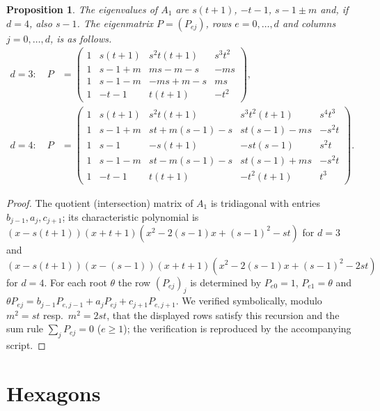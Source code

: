 \documentclass[11pt]{article}
\newtheorem{proposition}[theorem]{Proposition}
\theoremstyle{remark}
\begin{document}
\begin{proposition}\label{prop:P}
The eigenvalues of $A_1$ are $s(t+1)$, $-t-1$, $s-1\pm m$ and, if $d=4$, also $s-1$. The eigenmatrix $P=(P_{ej})$, rows $e=0,\dots,d$ and columns $j=0,\dots,d$, is as follows.
\begin{align*}
d=3:\quad P&=\begin{pmatrix}
1 & s(t+1) & s^2t(t+1) & s^3t^2\\
1 & s-1+m & ms-m-s & -ms\\
1 & s-1-m & -ms+m-s & ms\\
1 & -t-1 & t(t+1) & -t^2
\end{pmatrix},\\[4pt]
d=4:\quad P&=\begin{pmatrix}
1 & s(t+1) & s^2t(t+1) & s^3t^2(t+1) & s^4t^3\\
1 & s-1+m & st+m(s-1)-s & st(s-1)-ms & -s^2t\\
1 & s-1 & -s(t+1) & -st(s-1) & s^2t\\
1 & s-1-m & st-m(s-1)-s & st(s-1)+ms & -s^2t\\
1 & -t-1 & t(t+1) & -t^2(t+1) & t^3
\end{pmatrix}.
\end{align*}
\end{proposition}
\begin{proof}
The quotient (intersection) matrix of $A_1$ is tridiagonal with entries $b_{j-1},a_j,c_{j+1}$; its characteristic polynomial is $(x-s(t+1))(x+t+1)(x^2-2(s-1)x+(s-1)^2-st)$ for $d=3$ and $(x-s(t+1))(x-(s-1))(x+t+1)(x^2-2(s-1)x+(s-1)^2-2st)$ for $d=4$. For each root $\theta$ the row $(P_{ej})_j$ is determined by $P_{e0}=1$, $P_{e1}=\theta$ and $\theta P_{ej}=b_{j-1}P_{e,j-1}+a_jP_{ej}+c_{j+1}P_{e,j+1}$. We verified symbolically, modulo $m^2=st$ resp.\ $m^2=2st$, that the displayed rows satisfy this recursion and the sum rule $\sum_jP_{ej}=0$ ($e\ge1$); the verification is reproduced by the accompanying script.
\end{proof}

\section{Hexagons}
\end{document}
